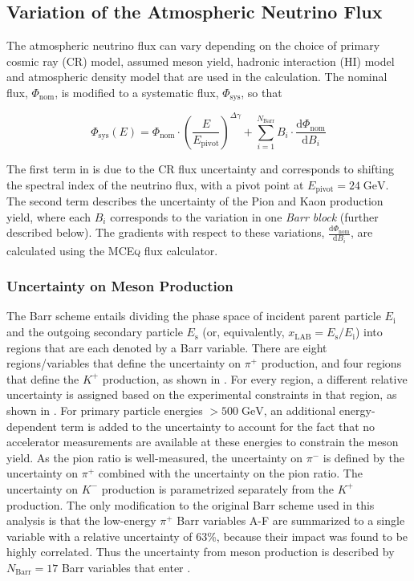 \subsection{Variation of the Atmospheric Neutrino Flux}
\label{sec:flux_systs}

The atmospheric neutrino flux can vary depending on the choice of primary cosmic ray (CR) model, assumed meson yield, hadronic interaction (HI) model and atmospheric density model that are used in the calculation. The nominal flux, $\Phi_\mathrm{nom}$, is modified to a systematic flux, $\Phi_\mathrm{sys}$, so that

\begin{equation}
    \Phi_{\mathrm{sys}}(E) = \Phi_{\mathrm{nom}} \cdot \left( \frac{E}{E_\mathrm{pivot}}\right)^{\Delta \gamma}
    +
    \sum_{i=1}^{N_\mathrm{Barr}} B_i \cdot \frac{\mathrm{d} \Phi_{\mathrm{nom}}}{\mathrm{d}B_i}\label{eq:flux-variation}
\end{equation}

The first term in  is due to the CR flux uncertainty and corresponds to shifting the spectral index of the neutrino flux, with a pivot point at $E_\mathrm{pivot}=24\;\mathrm{GeV}$. The second term describes the uncertainty of the Pion and Kaon production yield, where each $B_i$ corresponds to the variation in one \emph{Barr block} (further described below). The gradients with respect to these variations, $\frac{\mathrm{d} \Phi_{\mathrm{nom}}}{\mathrm{d}B_i}$, are calculated using the \textsc{MCEq}\cite{mceq} flux calculator.

\subsubsection{Uncertainty on Meson Production}
The Barr scheme entails dividing the phase space of incident parent particle $E_\mathrm{i}$ and the outgoing secondary particle $E_\mathrm{s}$ (or, equivalently, $x_{\mathrm{LAB}}=E_\mathrm{s}/E_\mathrm{i}$) into regions that are each denoted by a Barr variable. There are eight regions/variables that define the uncertainty on $ \pi^+ $ production, and four regions that define the $K^+$ production, as shown in . For every region, a different relative uncertainty is assigned based on the experimental constraints in that region, as shown in . For primary particle energies $>500\;\mathrm{GeV}$, an additional energy-dependent term is added to the uncertainty to account for the fact that no accelerator measurements are available at these energies to constrain the meson yield. As the pion ratio is well-measured, the uncertainty on $ \pi^- $ is defined by the uncertainty on $ \pi^+ $ combined with the uncertainty on the pion ratio. The uncertainty on $ K^- $ production is parametrized separately from the $K^+$ production. The only modification to the original Barr scheme used in this analysis is that the low-energy $ \pi^+ $ Barr variables A-F are summarized to a single variable with a relative uncertainty of 63\%, because their impact was found to be highly correlated. Thus the uncertainty from meson production is described by $N_\mathrm{Barr}=17$ Barr variables that enter .


